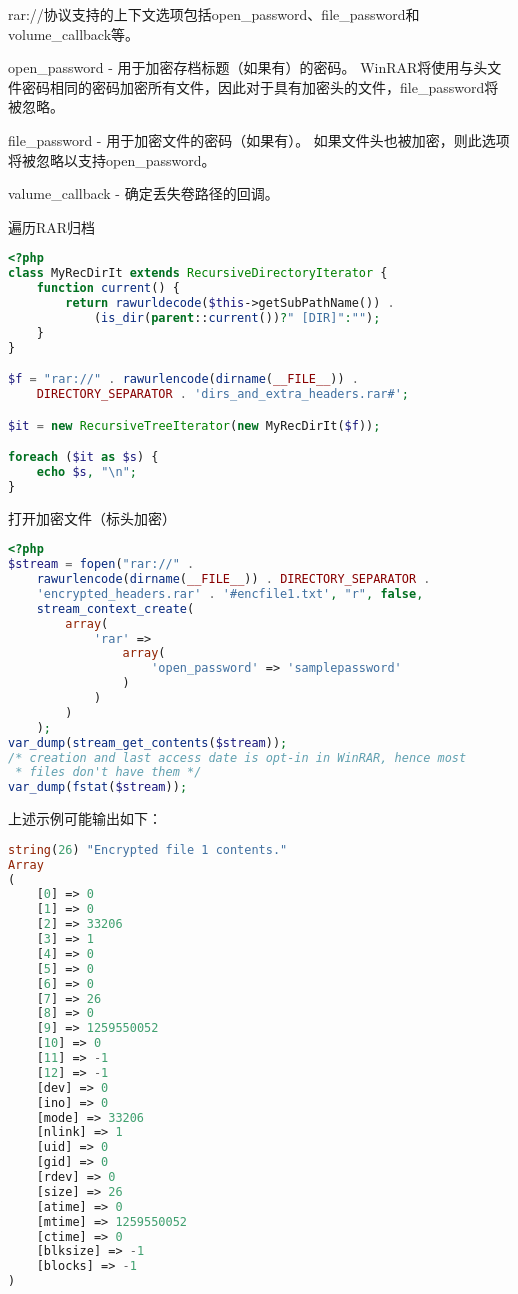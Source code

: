 rar://协议支持的上下文选项包括open\_password、file\_password和volume\_callback等。

\begin{compactitem}
\item open\_password - 用于加密存档标题（如果有）的密码。 WinRAR将使用与头文件密码相同的密码加密所有文件，因此对于具有加密头的文件，file\_password将被忽略。

\item file\_password - 用于加密文件的密码（如果有）。 如果文件头也被加密，则此选项将被忽略以支持open\_password。 

\item valume\_callback - 确定丢失卷路径的回调。
\end{compactitem}




\begin{example}
遍历RAR归档
\begin{lstlisting}[language=PHP]
<?php
class MyRecDirIt extends RecursiveDirectoryIterator {
    function current() {
        return rawurldecode($this->getSubPathName()) .
            (is_dir(parent::current())?" [DIR]":"");
    }
}

$f = "rar://" . rawurlencode(dirname(__FILE__)) .
    DIRECTORY_SEPARATOR . 'dirs_and_extra_headers.rar#';

$it = new RecursiveTreeIterator(new MyRecDirIt($f));

foreach ($it as $s) {
    echo $s, "\n";
}
\end{lstlisting}
\end{example}

\begin{example}
打开加密文件（标头加密）
\begin{lstlisting}[language=PHP]
<?php
$stream = fopen("rar://" .
    rawurlencode(dirname(__FILE__)) . DIRECTORY_SEPARATOR .
    'encrypted_headers.rar' . '#encfile1.txt', "r", false,
    stream_context_create(
        array(
            'rar' =>
                array(
                    'open_password' => 'samplepassword'
                )
            )
        )
    );
var_dump(stream_get_contents($stream));
/* creation and last access date is opt-in in WinRAR, hence most
 * files don't have them */
var_dump(fstat($stream));
\end{lstlisting}
\end{example}

上述示例可能输出如下：

\begin{lstlisting}[language=PHP]
string(26) "Encrypted file 1 contents."
Array
(
    [0] => 0
    [1] => 0
    [2] => 33206
    [3] => 1
    [4] => 0
    [5] => 0
    [6] => 0
    [7] => 26
    [8] => 0
    [9] => 1259550052
    [10] => 0
    [11] => -1
    [12] => -1
    [dev] => 0
    [ino] => 0
    [mode] => 33206
    [nlink] => 1
    [uid] => 0
    [gid] => 0
    [rdev] => 0
    [size] => 26
    [atime] => 0
    [mtime] => 1259550052
    [ctime] => 0
    [blksize] => -1
    [blocks] => -1
)
\end{lstlisting}


